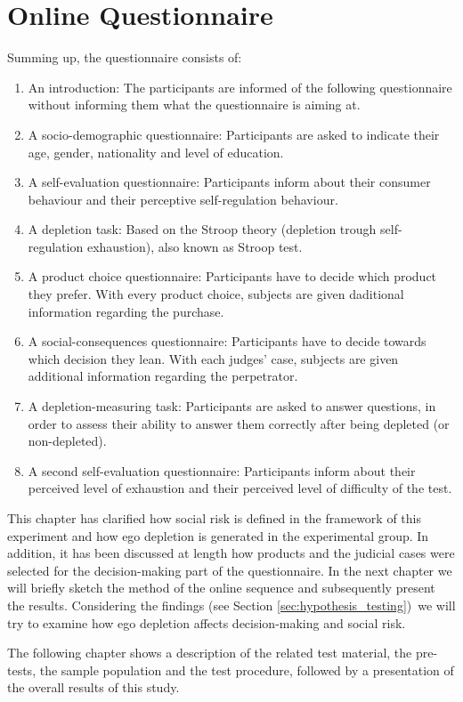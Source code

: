 \section{Online Questionnaire}
Summing up, the questionnaire consists of:
\begin{enumerate}
\item An introduction: The participants are informed of the following questionnaire without informing them what the questionnaire is aiming at. 
\item A socio-demographic questionnaire: Participants are asked to indicate their age, gender, nationality and level of education.
\item A self-evaluation questionnaire: Participants inform about their consumer behaviour and their perceptive self-regulation behaviour.
\item A depletion task: Based on the Stroop theory (depletion trough self-regulation exhaustion), also known as Stroop test.  
\item A product choice questionnaire: Participants have to decide which product they prefer. With every product choice, subjects are given daditional information regarding the purchase.
\item A social-consequences questionnaire: Participants have to decide towards which decision they lean. With each judges’ case, subjects are given additional information regarding the perpetrator.
\item A depletion-measuring task: Participants are asked to answer questions, in order to assess their ability to answer them correctly after being depleted (or non-depleted).
\item A second self-evaluation questionnaire: Participants inform about their perceived level of exhaustion and their perceived level of difficulty of the test.
\end{enumerate}

This chapter has clarified how social risk is defined in the framework of this experiment and how ego depletion is generated in the experimental group.  In addition, it has been discussed at length how products and the judicial cases were selected for the decision-making part of the questionnaire. In the next chapter we will briefly sketch the method of the online sequence and subsequently present the results. Considering the findings (see Section \ref{sec:hypothesis_testing})\, we will try to examine how ego depletion affects decision-making and social risk. \par
The following chapter shows a description of the related test material, the pre-tests, the sample population and the test procedure, followed by a presentation of the overall results of this study.\par

